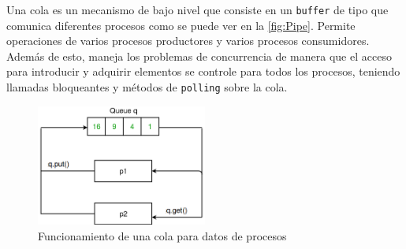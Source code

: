 Una cola es un mecanismo de bajo nivel que consiste en un \texttt{buffer} de tipo \texttt{} que comunica diferentes procesos como se puede ver en la \autoref{fig:Pipe}. Permite operaciones de varios procesos productores y varios 
procesos consumidores. Además de esto, maneja los problemas de concurrencia de manera que el acceso para introducir y adquirir elementos se controle para todos los procesos, teniendo llamadas bloqueantes 
y métodos de \texttt{polling} sobre la cola.
\begin{figure}[H]
    \centering
    \includegraphics[width=0.5\textwidth]{images/6/6.5/Pipe.png}
    \caption{Funcionamiento de una cola para datos de procesos}
    \label{fig:Pipe}
\end{figure}

